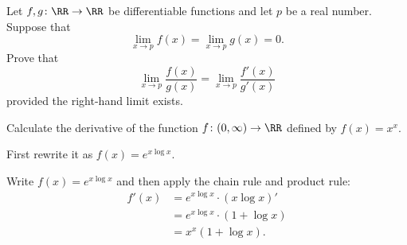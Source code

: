 \begin{problem}
	Let $f,g \colon \RR \to \RR$ be differentiable functions
	and let $p$ be a real number.
	Suppose that
	\[ \lim_{x \to p} f(x) = \lim_{x \to p} g(x) = 0. \]
	Prove that
	\[ \lim_{x \to p} \frac{f(x)}{g(x)}
		= \lim_{x \to p} \frac{f'(x)}{g'(x)} \]
	provided the right-hand limit exists.
\end{problem}

\begin{problem}
	Calculate the derivative of the function $f \colon (0,\infty) \to \RR$
	defined by $f(x) = x^x$.
	\begin{hint}
		First rewrite it as $f(x) = e^{x \log x}$.
	\end{hint}
	\begin{sol}
		Write $f(x) = e^{x \log x}$ and then apply the chain rule and product rule:
		\begin{align*}
			f'(x) &= e^{x \log x} \cdot (x \log x)' \\
				&= e^{x \log x} \cdot \left( 1 + \log x \right) \\
				&= x^x \left( 1 + \log x \right).
		\end{align*}
	\end{sol}
\end{problem}
